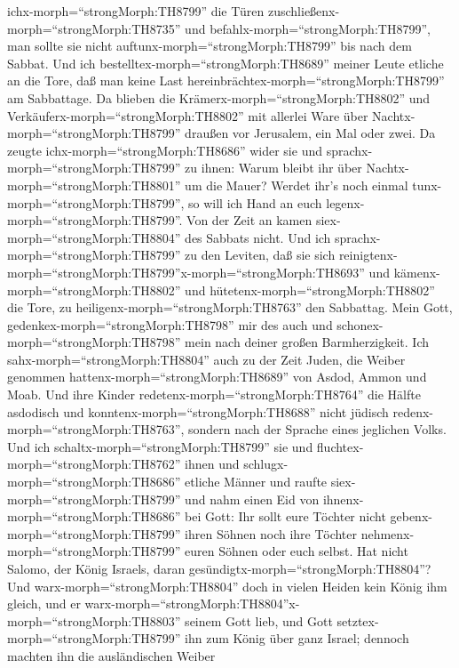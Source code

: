 ichx-morph=``strongMorph:TH8799'' die Türen
zuschließenx-morph=``strongMorph:TH8735'' und
befahlx-morph=``strongMorph:TH8799'', man sollte sie nicht
auftunx-morph=``strongMorph:TH8799'' bis nach dem Sabbat. Und ich
bestelltex-morph=``strongMorph:TH8689'' meiner Leute etliche an die
Tore, daß man keine Last hereinbrächtex-morph=``strongMorph:TH8799'' am
Sabbattage.  Da blieben die
Krämerx-morph=``strongMorph:TH8802'' und
Verkäuferx-morph=``strongMorph:TH8802'' mit allerlei Ware über
Nachtx-morph=``strongMorph:TH8799'' draußen vor Jerusalem, ein Mal oder
zwei.  Da zeugte ichx-morph=``strongMorph:TH8686'' wider
sie und sprachx-morph=``strongMorph:TH8799'' zu ihnen: Warum bleibt ihr
über Nachtx-morph=``strongMorph:TH8801'' um die Mauer? Werdet ihr's noch
einmal tunx-morph=``strongMorph:TH8799'', so will ich Hand an euch
legenx-morph=``strongMorph:TH8799''. Von der Zeit an kamen
siex-morph=``strongMorph:TH8804'' des Sabbats nicht.  Und
ich sprachx-morph=``strongMorph:TH8799'' zu den Leviten, daß sie sich
reinigtenx-morph=``strongMorph:TH8799''x-morph=``strongMorph:TH8693''
und kämenx-morph=``strongMorph:TH8802'' und
hütetenx-morph=``strongMorph:TH8802'' die Tore, zu
heiligenx-morph=``strongMorph:TH8763'' den Sabbattag. Mein Gott,
gedenkex-morph=``strongMorph:TH8798'' mir des auch und
schonex-morph=``strongMorph:TH8798'' mein nach deiner großen
Barmherzigkeit.  Ich sahx-morph=``strongMorph:TH8804'' auch
zu der Zeit Juden, die Weiber genommen
hattenx-morph=``strongMorph:TH8689'' von Asdod, Ammon und Moab.
 Und ihre Kinder redetenx-morph=``strongMorph:TH8764'' die
Hälfte asdodisch und konntenx-morph=``strongMorph:TH8688'' nicht jüdisch
redenx-morph=``strongMorph:TH8763'', sondern nach der Sprache eines
jeglichen Volks.  Und ich
schaltx-morph=``strongMorph:TH8799'' sie und
fluchtex-morph=``strongMorph:TH8762'' ihnen und
schlugx-morph=``strongMorph:TH8686'' etliche Männer und raufte
siex-morph=``strongMorph:TH8799'' und nahm einen Eid von
ihnenx-morph=``strongMorph:TH8686'' bei Gott: Ihr sollt eure Töchter
nicht gebenx-morph=``strongMorph:TH8799'' ihren Söhnen noch ihre Töchter
nehmenx-morph=``strongMorph:TH8799'' euren Söhnen oder euch selbst.
 Hat nicht Salomo, der König Israels, daran
gesündigtx-morph=``strongMorph:TH8804''? Und
warx-morph=``strongMorph:TH8804'' doch in vielen Heiden kein König ihm
gleich, und er
warx-morph=``strongMorph:TH8804''x-morph=``strongMorph:TH8803'' seinem
Gott lieb, und Gott setztex-morph=``strongMorph:TH8799'' ihn zum König
über ganz Israel; dennoch machten ihn die ausländischen Weiber
